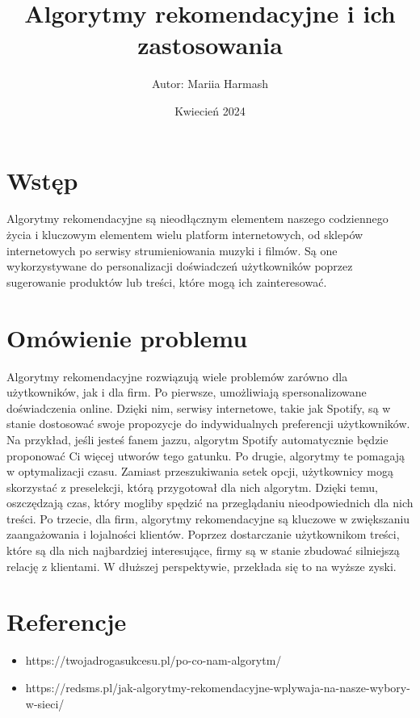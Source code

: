 \documentclass{article}
\title{Algorytmy rekomendacyjne i ich zastosowania}
\author{Autor: Mariia Harmash}
\date{Kwiecień 2024}
\begin{document}
\maketitle
\newpage

\section{Wstęp}

Algorytmy rekomendacyjne są nieodłącznym elementem naszego codziennego życia i kluczowym elementem wielu platform internetowych,
od sklepów internetowych po serwisy strumieniowania muzyki i filmów. Są one wykorzystywane do personalizacji doświadczeń użytkowników
poprzez sugerowanie produktów lub treści, które mogą ich zainteresować.

\section{Omówienie problemu}

Algorytmy rekomendacyjne rozwiązują wiele problemów zarówno dla użytkowników, jak i dla firm. \newline
Po pierwsze, umożliwiają spersonalizowane doświadczenia online. Dzięki nim, serwisy internetowe, takie jak Spotify, są w stanie dostosować swoje propozycje 
do indywidualnych preferencji użytkowników. Na przykład, jeśli jesteś fanem jazzu, algorytm Spotify automatycznie będzie proponować Ci więcej utworów tego gatunku.\newline
Po drugie, algorytmy te pomagają w optymalizacji czasu. Zamiast przeszukiwania setek opcji, użytkownicy mogą skorzystać z preselekcji, którą przygotował dla nich algorytm. 
Dzięki temu, oszczędzają czas, który mogliby spędzić na przeglądaniu nieodpowiednich dla nich treści.\newline
Po trzecie, dla firm, algorytmy rekomendacyjne są kluczowe w zwiększaniu zaangażowania i lojalności klientów. Poprzez dostarczanie użytkownikom treści, 
które są dla nich najbardziej interesujące, firmy są w stanie zbudować silniejszą relację z klientami. W dłuższej perspektywie, przekłada się to na wyższe zyski.

\section{Referencje}
\begin{itemize}
    \item https://twojadrogasukcesu.pl/po-co-nam-algorytm/
    \item https://redsms.pl/jak-algorytmy-rekomendacyjne-wplywaja-na-nasze-wybory-w-sieci/
    
\end{itemize}
\end{document}
